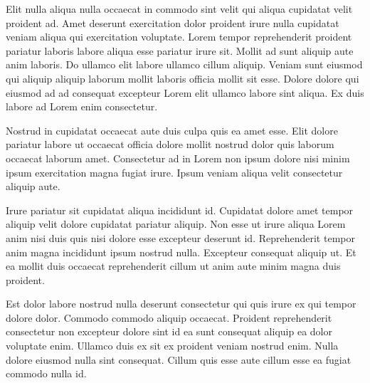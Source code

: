 Elit nulla aliqua nulla occaecat in commodo sint velit qui aliqua cupidatat velit proident ad. Amet deserunt exercitation dolor proident irure nulla cupidatat veniam aliqua qui exercitation voluptate. Lorem tempor reprehenderit proident pariatur laboris labore aliqua esse pariatur irure sit. Mollit ad sunt aliquip aute anim laboris. Do ullamco elit labore ullamco cillum aliquip. Veniam sunt eiusmod qui aliquip aliquip laborum mollit laboris officia mollit sit esse. Dolore dolore qui eiusmod ad ad consequat excepteur Lorem elit ullamco labore sint aliqua. Ex duis labore ad Lorem enim consectetur.

Nostrud in cupidatat occaecat aute duis culpa quis ea amet esse. Elit dolore pariatur labore ut occaecat officia dolore mollit nostrud dolor quis laborum occaecat laborum amet. Consectetur ad in Lorem non ipsum dolore nisi minim ipsum exercitation magna fugiat irure. Ipsum veniam aliqua velit consectetur aliquip aute.

Irure pariatur sit cupidatat aliqua incididunt id. Cupidatat dolore amet tempor aliquip velit dolore cupidatat pariatur aliquip. Non esse ut irure aliqua Lorem anim nisi duis quis nisi dolore esse excepteur deserunt id. Reprehenderit tempor anim magna incididunt ipsum nostrud nulla. Excepteur consequat aliquip ut. Et ea mollit duis occaecat reprehenderit cillum ut anim aute minim magna duis proident.

Est dolor labore nostrud nulla deserunt consectetur qui quis irure ex qui tempor dolore dolor. Commodo commodo aliquip occaecat. Proident reprehenderit consectetur non excepteur dolore sint id ea sunt consequat aliquip ea dolor voluptate enim. Ullamco duis ex sit ex proident veniam nostrud enim. Nulla dolore eiusmod nulla sint consequat. Cillum quis esse aute cillum esse ea fugiat commodo nulla id.
